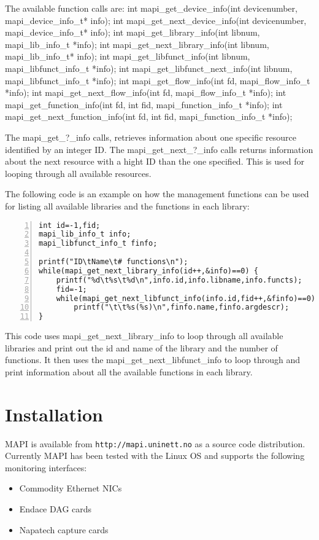 \documentclass[a4paper, 11pt]{article}
\newenvironment{code}{\small\verbatim}{\endverbatim}
\begin{document}
The available function calls are:
\begin{code}
int mapi_get_device_info(int devicenumber, mapi_device_info_t* info);
int mapi_get_next_device_info(int devicenumber, mapi_device_info_t* info);
int mapi_get_library_info(int libnum, mapi_lib_info_t *info);
int mapi_get_next_library_info(int libnum, mapi_lib_info_t* info);
int mapi_get_libfunct_info(int libnum, mapi_libfunct_info_t *info);
int mapi_get_libfunct_next_info(int libnum, mapi_libfunct_info_t *info);
int mapi_get_flow_info(int fd, mapi_flow_info_t *info);
int mapi_get_next_flow_info(int fd, mapi_flow_info_t *info);
int mapi_get_function_info(int fd, int fid, mapi_function_info_t *info);
int mapi_get_next_function_info(int fd, int fid, mapi_function_info_t *info);
\end{code}

The mapi\_get\_?\_info calls, retrieves information about one specific resource
identified by an integer ID. The mapi\_get\_next\_?\_info calls returns information
about the next resource with a hight ID than the one specified. This is used for
looping through all available resources.

The following code is an example on how the management functions can be used for
listing all available libraries and the functions in each library:

\begin{Verbatim}[numbersep=12pt, numbers=left, baselinestretch=1.0, fontsize=\small]
int id=-1,fid;
mapi_lib_info_t info;
mapi_libfunct_info_t finfo;
	
printf("ID\tName\t# functions\n");
while(mapi_get_next_library_info(id++,&info)==0) {
	printf("%d\t%s\t%d\n",info.id,info.libname,info.functs);
	fid=-1;
	while(mapi_get_next_libfunct_info(info.id,fid++,&finfo)==0)
  	    printf("\t\t%s(%s)\n",finfo.name,finfo.argdescr);		
}
\end{Verbatim}

This code uses mapi\_get\_next\_library\_info to loop through all available libraries 
and print out the id and name of the library and the number of functions. 
It then uses the mapi\_get\_next\_libfunct\_info to loop through and print 
information about all the available functions in each library.

\section{Installation}

MAPI is available from {\tt http://mapi.uninett.no} as a source
code distribution.
Currently MAPI has been tested with the Linux OS and supports the following
monitoring interfaces:
\begin{itemize}
\item Commodity Ethernet NICs
\item Endace DAG cards
\item Napatech capture cards
\end{itemize}
\end{document}
